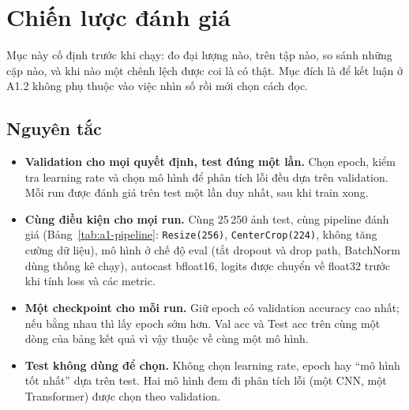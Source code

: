 \section{Chiến lược đánh giá}\label{sec:a1-eval}
Mục này cố định trước khi chạy: đo đại lượng nào, trên tập nào, so sánh những cặp nào, và khi nào một chênh lệch được coi là có thật. Mục đích là để kết luận ở A1.2 không phụ thuộc vào việc nhìn số rồi mới chọn cách đọc.

\subsection{Nguyên tắc}
\begin{itemize}
\item \textbf{Validation cho mọi quyết định, test đúng một lần.} Chọn epoch, kiểm tra learning rate và chọn mô hình để phân tích lỗi đều dựa trên validation. Mỗi run được đánh giá trên test một lần duy nhất, sau khi train xong.
\item \textbf{Cùng điều kiện cho mọi run.} Cùng 25\,250 ảnh test, cùng pipeline đánh giá (Bảng~\ref{tab:a1-pipeline}: \texttt{Resize(256)}, \texttt{CenterCrop(224)}, không tăng cường dữ liệu), mô hình ở chế độ eval (tắt dropout và drop path, BatchNorm dùng thống kê chạy), autocast bfloat16, logits được chuyển về float32 trước khi tính loss và các metric.
\item \textbf{Một checkpoint cho mỗi run.} Giữ epoch có validation accuracy cao nhất; nếu bằng nhau thì lấy epoch sớm hơn. Val acc và Test acc trên cùng một dòng của bảng kết quả vì vậy thuộc về cùng một mô hình.
\item \textbf{Test không dùng để chọn.} Không chọn learning rate, epoch hay ``mô hình tốt nhất'' dựa trên test. Hai mô hình đem đi phân tích lỗi (một CNN, một Transformer) được chọn theo validation.
\end{itemize}

